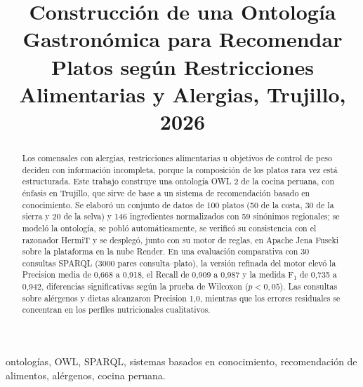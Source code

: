 \documentclass[conference]{IEEEtran}
\begin{document}
\title{Construcción de una Ontología Gastronómica para Recomendar Platos según Restricciones Alimentarias y Alergias, Trujillo, 2026}

\author{
\and
{}
\and
{}
}

\maketitle

\begin{abstract}
Los comensales con alergias, restricciones alimentarias u objetivos de control de peso deciden con información incompleta, porque la composición de los platos rara vez está estructurada. Este trabajo construye una ontología OWL 2 de la cocina peruana, con énfasis en Trujillo, que sirve de base a un sistema de recomendación basado en conocimiento. Se elaboró un conjunto de datos de 100 platos (50 de la costa, 30 de la sierra y 20 de la selva) y 146 ingredientes normalizados con 59 sinónimos regionales; se modeló la ontología, se pobló automáticamente, se verificó su consistencia con el razonador HermiT y se desplegó, junto con su motor de reglas, en Apache Jena Fuseki sobre la plataforma en la nube Render. En una evaluación comparativa con 30 consultas SPARQL (3000 pares consulta--plato), la versión refinada del motor elevó la Precision media de 0,668 a 0,918, el Recall de 0,909 a 0,987 y la medida F$_1$ de 0,735 a 0,942, diferencias significativas según la prueba de Wilcoxon ($p<0{,}05$). Las consultas sobre alérgenos y dietas alcanzaron Precision 1,0, mientras que los errores residuales se concentran en los perfiles nutricionales cualitativos.
\end{abstract}

\begin{IEEEkeywords}
ontologías, OWL, SPARQL, sistemas basados en conocimiento, recomendación de alimentos, alérgenos, cocina peruana.
\end{IEEEkeywords}
\end{document}

